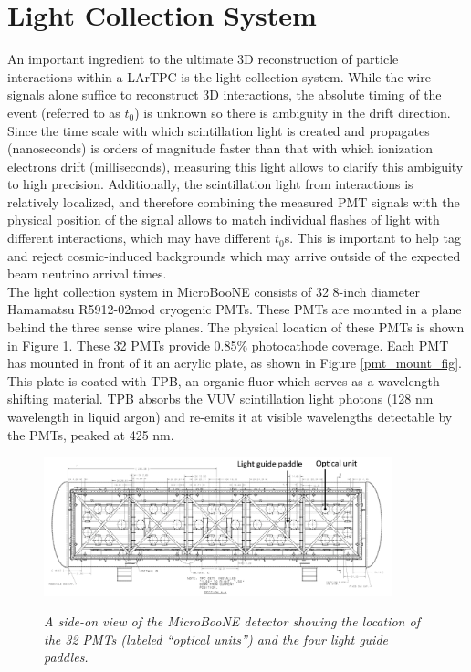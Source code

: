 \section{Light Collection System}
An important ingredient to the ultimate 3D reconstruction of particle interactions within a LArTPC is the light collection system. While the wire signals alone suffice to reconstruct 3D interactions, the absolute timing of the event (referred to as $t_0$) is unknown so there is ambiguity in the drift direction. Since the time scale with which scintillation light is created and propagates (nanoseconds) is orders of magnitude faster than that with which ionization electrons drift (milliseconds), measuring this light allows to clarify this ambiguity to high precision. Additionally, the scintillation light from interactions is relatively localized, and therefore combining the measured PMT signals with the physical position of the signal allows to match individual flashes of light with different interactions, which may have different $t_0$s. This is important to help tag and reject cosmic-induced backgrounds which may arrive outside of the expected beam neutrino arrival times.\\

The light collection system in MicroBooNE consists of 32 8-inch diameter Hamamatsu R5912-02mod cryogenic PMTs. These PMTs are mounted in a plane behind the three sense wire planes. The physical location of these PMTs is shown in Figure \ref{pmt_placement_fig}. These 32 PMTs provide 0.85\% photocathode coverage. Each PMT has mounted in front of it an acrylic plate, as shown in Figure \ref{pmt_mount_fig}. This plate is coated with TPB, an organic fluor which serves as a wavelength-shifting material. TPB absorbs the VUV scintillation light photons (128 nm wavelength in liquid argon) and re-emits it at visible wavelengths detectable by the PMTs, peaked at 425 nm.

\begin{figure}[ht!]
\centering
	\includegraphics[width=0.9\textwidth]{Figures/pmt_placement.png} \\
\caption{\textit{A side-on view of the MicroBooNE detector showing the location of the 32 PMTs (labeled ``optical units'') and the four light guide paddles.}}\label{pmt_placement_fig}
\end{figure}


